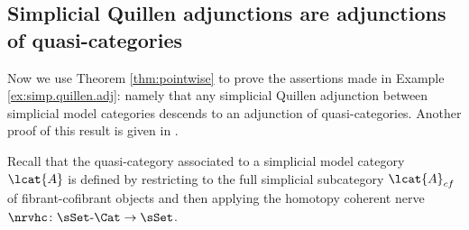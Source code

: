 

\subsection{Simplicial Quillen adjunctions are adjunctions of quasi-categories}

Now we use Theorem \ref{thm:pointwise} to prove the assertions made in Example \ref{ex:simp.quillen.adj}: namely that any simplicial Quillen adjunction between simplicial model categories descends to an adjunction of quasi-categories. Another proof of this result is given in \cite[5.2.4.6]{Lurie:2009fk}. 

Recall that the quasi-category associated to a simplicial model category $\lcat{A}$ is defined by restricting to the full simplicial subcategory $\lcat{A}_{cf}$ of fibrant-cofibrant objects and then applying the homotopy coherent nerve $\nrvhc\colon \sSet\text{-}\Cat \to \sSet$. 

